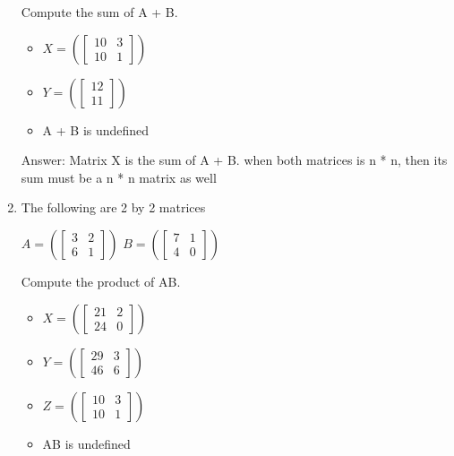 \documentclass{article}
\begin{document}
\begin{enumerate}
        Compute the sum of A + B.
        
        \begin{itemize}
            \item $X = \left( \begin{bmatrix} 10&3\\ 10&1 \end{bmatrix} \right)$
            \item  $Y = \left( \begin{bmatrix} 12\\ 11 \end{bmatrix} \right)$
            \item  A + B is undefined    
        \end{itemize}
        
        Answer: Matrix X is the sum of A + B. when both matrices is n * n, then its sum must be a n * n matrix as well

    \item The following are 2 by 2 matrices 
        
         $A = \left( \begin{bmatrix} 3&2\\ 6&1 \end{bmatrix} \right)$
         $B = \left( \begin{bmatrix} 7&1\\ 4&0 \end{bmatrix} \right)$ 
        
        Compute the product of AB.
        
        \begin{itemize}
            \item $X = \left( \begin{bmatrix} 21&2\\ 24&0 \end{bmatrix} \right)$
            \item  $Y = \left( \begin{bmatrix} 29&3\\ 46&6 \end{bmatrix} \right)$
            \item  $Z = \left( \begin{bmatrix} 10&3\\ 10&1 \end{bmatrix} \right)$
            \item  AB is undefined    
        \end{itemize}
        

\end{enumerate}
\end{document}

